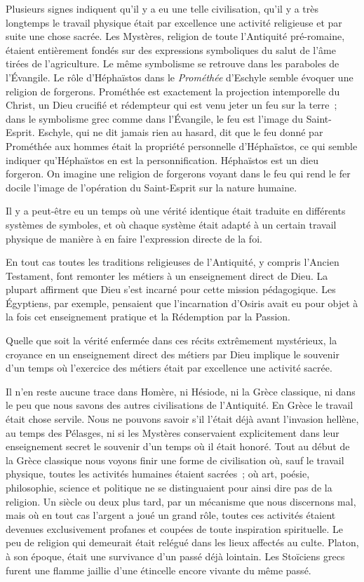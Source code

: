 \documentclass[french,twoside]{book} %
\begin{document}
Plusieurs signes indiquent qu'il y a eu une telle civilisation, qu'il y a très longtemps le travail physique était par excellence une activité religieuse et par suite une chose sacrée. Les Mystères, religion de toute l'Antiquité pré-romaine, étaient entièrement fondés sur des expressions symboliques du salut de l'âme tirées de l'agriculture. Le même symbolisme se retrouve dans les paraboles de l'Évangile. Le rôle d'Héphaïstos dans le {\itshape Prométhée} d'Eschyle semble évoquer une religion de forgerons. Prométhée est exactement la projection intemporelle du Christ, un Dieu crucifié et rédempteur qui est venu jeter un feu sur la terre ; dans le symbolisme grec comme dans l'Évangile, le feu est l'image du Saint-Esprit. Eschyle, qui ne dit jamais rien au hasard, dit que le feu donné par Prométhée aux hommes était la propriété personnelle d'Héphaïstos, ce qui semble indiquer qu'Héphaïstos en est la personnification. Héphaïstos est un dieu forgeron. On imagine une religion de forgerons voyant dans le feu qui rend le fer docile l'image de l'opération du Saint-Esprit sur la nature humaine.\par
Il y a peut-être eu un temps où une vérité identique était traduite en différents systèmes de symboles, et où chaque système était adapté à un certain travail physique de manière à en faire l'expression directe de la foi.\par
En tout cas toutes les traditions religieuses de l'Antiquité, y compris l'Ancien Testament, font remonter les métiers à un enseignement direct de Dieu. La plupart affirment que Dieu s'est incarné pour cette mission pédagogique. Les Égyptiens, par exemple, pensaient que l'incarnation d'Osiris avait eu pour objet à la fois cet enseignement pratique et la Rédemption par la Passion.\par
Quelle que soit la vérité enfermée dans ces récits extrêmement mystérieux, la croyance en un enseignement direct des métiers par Dieu implique le souvenir d'un temps où l'exercice des métiers était par excellence une activité sacrée.\par
Il n'en reste aucune trace dans Homère, ni Hésiode, ni la Grèce classique, ni dans le peu que nous savons des autres civilisations de l'Antiquité. En Grèce le travail était chose servile. Nous ne pouvons savoir s'il l'était déjà avant l'invasion hellène, au temps des Pélasges, ni si les Mystères conservaient explicitement dans leur enseignement secret le souvenir d'un temps où il était honoré. Tout au début de la Grèce classique nous voyons finir une forme de civilisation où, sauf le travail physique, toutes les activités humaines étaient sacrées ; où art, poésie, philosophie, science et politique ne se distinguaient pour ainsi dire pas de la religion. Un siècle ou deux plus tard, par un mécanisme que nous discernons mal, mais où en tout cas l'argent a joué un grand rôle, toutes ces activités étaient devenues exclusivement profanes et coupées de toute inspiration spirituelle. Le peu de religion qui demeurait était relégué dans les lieux affectés au culte. Platon, à son époque, était une survivance d'un passé déjà lointain. Les Stoïciens grecs furent une flamme jaillie d'une étincelle encore vivante du même passé.\par
\end{document}
